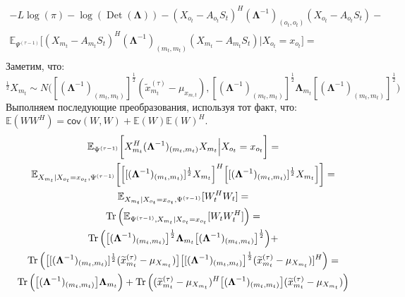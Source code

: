 \documentclass[11pt]{article}
\newcommand{\Expect}{\mathbb{E}}
\newcommand{\Cov}{\mathsf{cov}}
\DeclareMathOperator{\Det}{Det}
\begin{document}
\begin{equation*}
\begin{gathered}
-L \log(\pi) - \log (\Det(\mathbf{\Lambda}))  - (X_{o_t} - A_{o_t}S_t)^H (\mathbf{\Lambda}^{-1})_{(o_t, o_t)} (X_{o_t} - A_{o_t}S_t) - \\ \Expect_{\Psi^{(\tau-1)}} \bigg[ (X_{m_t} - A_{m_t}S_t)^H (\mathbf{\Lambda}^{-1})_{(m_t, m_t)} (X_{m_t} - A_{m_t}S_t) 
\Big|X_{o_t}=x_{o_t}\bigg] = \\
\end{gathered}
\end{equation*}
Заметим, что: 
\begin{equation*}
[(\mathbf{\Lambda}^{-1})_{(m_t, m_t)}]^{\frac{1}{2}}X_{m_t} \sim N\Big([(\mathbf{\Lambda}^{-1})_{(m_t, m_t)}]^{\frac{1}{2}}(\widetilde{x}_{m_t}^{(\tau)} - \mu_{x_{m,t}}),[(\mathbf{\Lambda}^{-1})_{(m_t, m_t)}]^{\frac{1}{2}}\mathbf{\Lambda}_{m_t}[(\mathbf{\Lambda}^{-1})_{(m_t, m_t)}]^{\frac{1}{2}}\Big)
\end{equation*}
Выполняем последующие преобразования, используя тот факт, что: $\Expect(WW^H)=\Cov(W,W)+\Expect(W)\Expect(W)^H$.
\begin{equation*}
\begin{gathered}
\Expect_{\Psi^{(\tau-1)}}\bigg[X_{m_t}^H (\mathbf{\Lambda}^{-1})_{(m_t, m_t)}X_{m_t}   \Big|X_{o_t}=x_{o_t}\bigg] = \\
\Expect_{X_{m_t}|X_{o_t}=x_{o_t}, \Psi^{(\tau-1)}}\bigg[\Big[[(\mathbf{\Lambda}^{-1})_{(m_t, m_t)}]^{\frac{1}{2}}X_{m_t}\Big]^H\Big[[(\mathbf{\Lambda}^{-1})_{(m_t, m_t)}]^{\frac{1}{2}}X_{m_t}\Big]\bigg] = \\
\Expect_{X_{m_t}|X_{o_t}=x_{o_t}, \Psi^{(\tau-1)}}[W_t^HW_t] = \\
\Tr \Big( \Expect_{\Psi^{(\tau-1)},X_{m_t}|X_{o_t}=x_{o_t}}[W_tW_t^H] \Big) = \\
\Tr \Big( \big[(\mathbf{\Lambda}^{-1})_{(m_t, m_t)}\big]^{\frac{1}{2}}\mathbf{\Lambda}_{m_t}\big[(\mathbf{\Lambda}^{-1})_{(m_t, m_t)}\big]^{\frac{1}{2}} \Big) + \\ \Tr \Big( \big[[(\mathbf{\Lambda}^{-1})_{(m_t, m_t)}]^{\frac{1}{2}}(\widetilde{x}_{m_t}^{(\tau)} - \mu_{X_{m_t}})\big]\big[[(\mathbf{\Lambda}^{-1})_{(m_t, m_t)}\big]^{\frac{1}{2}}(\widetilde{x}_{m_t}^{(\tau)} - \mu_{X_{m_t}})]^H \Big)= \\
\Tr \Big( \big[(\mathbf{\Lambda}^{-1})_{(m_t, m_t)}\big]\mathbf{\Lambda}_{m_t} \Big) + \Tr \Big((\widetilde{x}_{m_t}^{(\tau)} - \mu_{X_{m_t}})^H\big[(\mathbf{\Lambda}^{-1})_{(m_t, m_t)}\big](\widetilde{x}_{m_t}^{(\tau)} - \mu_{X_{m_t}}) \Big) \\
\end{gathered}
\end{equation*}
\end{document}
